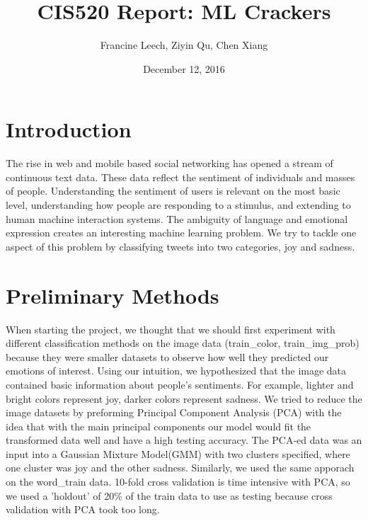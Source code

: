 \documentclass[]{article}
\begin{document}
\title{CIS520 Report: ML Crackers}   %
\author{Francine Leech, Ziyin Qu, Chen Xiang}         %
\date{December 12, 2016}    %
\maketitle

\section{Introduction}

The rise in web and mobile based social networking has opened a stream of continuous text data. These data reflect the sentiment of individuals and masses of people. Understanding the sentiment of users is relevant on the most basic level, understanding how people are responding to a stimulus, and extending to human machine interaction systems. The ambiguity of language and emotional expression creates an interesting machine learning problem.  We try to tackle one aspect of this problem by classifying tweets into two categories, joy and sadness. 

\section{Preliminary Methods}

When starting the project, we thought that we should first experiment with different classification methods on the image data (train\_color, train\_img\_prob) because they were smaller datasets to observe how well they predicted our emotions of interest. Using our intuition, we hypothesized that the image data contained basic information about people's sentiments. For example, lighter and bright colors represent joy, darker colors represent sadness. We tried to reduce the image datasets by preforming Principal Component Analysis (PCA) with the idea that with the main principal components our model would fit the transformed data well and have a high testing accuracy. The PCA-ed data was an input into a Gaussian Mixture Model(GMM) with two clusters specified, where one cluster was joy and the other sadness. Similarly, we used the same apporach on the word\_train data. 10-fold cross validation is time intensive with PCA, so we used a 'holdout' of 20\% of the train data to use as testing because cross validation with PCA took too long. \\
\end{document}

